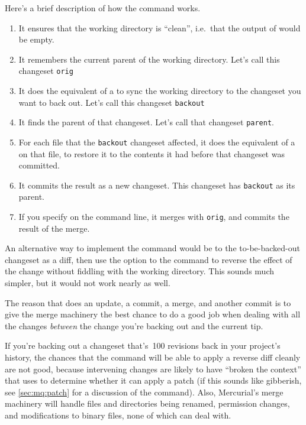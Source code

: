 Here's a brief description of how the  command works.
\begin{enumerate}
\item It ensures that the working directory is ``clean'', i.e.~that
  the output of  would be empty.
\item It remembers the current parent of the working directory.  Let's
  call this changeset \texttt{orig}
\item It does the equivalent of a  to sync the working
  directory to the changeset you want to back out.  Let's call this
  changeset \texttt{backout}
\item It finds the parent of that changeset.  Let's call that
  changeset \texttt{parent}.
\item For each file that the \texttt{backout} changeset affected, it
  does the equivalent of a  on that file,
  to restore it to the contents it had before that changeset was
  committed.
\item It commits the result as a new changeset.  This changeset has
  \texttt{backout} as its parent.
\item If you specify  on the command line, it
  merges with \texttt{orig}, and commits the result of the merge.
\end{enumerate}

An alternative way to implement the  command would be
to  the to-be-backed-out changeset as a diff, then use
the  option to the  command to
reverse the effect of the change without fiddling with the working
directory.  This sounds much simpler, but it would not work nearly as
well.

The reason that  does an update, a commit, a merge, and
another commit is to give the merge machinery the best chance to do a
good job when dealing with all the changes \emph{between} the change
you're backing out and the current tip.  

If you're backing out a changeset that's~100 revisions back in your
project's history, the chances that the  command will
be able to apply a reverse diff cleanly are not good, because
intervening changes are likely to have ``broken the context'' that
 uses to determine whether it can apply a patch (if
this sounds like gibberish, see \ref{sec:mq:patch} for a
discussion of the  command).  Also, Mercurial's merge
machinery will handle files and directories being renamed, permission
changes, and modifications to binary files, none of which
 can deal with.

